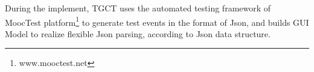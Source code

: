 
During the implement, TGCT uses the automated testing framework of MoocTest platform\footnote{www.mooctest.net} to generate test events in the format of Json, and builds GUI Model to realize flexible Json parsing, according to Json data structure. 





